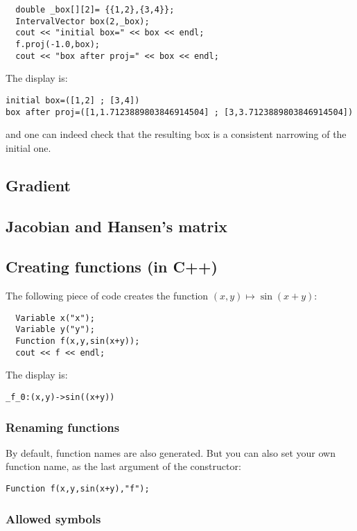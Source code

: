 \begin{lstlisting}
  double _box[][2]= {{1,2},{3,4}};
  IntervalVector box(2,_box);
  cout << "initial box=" << box << endl;
  f.proj(-1.0,box);
  cout << "box after proj=" << box << endl;
\end{lstlisting}
The display is:
\begin{verbatim}
initial box=([1,2] ; [3,4])
box after proj=([1,1.7123889803846914504] ; [3,3.7123889803846914504])
\end{verbatim}
and one can indeed check that the resulting box is a consistent narrowing
of the initial one.

\subsection{Gradient}


\subsection{Jacobian and Hansen's matrix}

\subsection{Creating functions (in C++)}\label{sec:mod-func-cpp}

The following piece of code creates the function
$(x,y)\mapsto \sin(x+y)$:

\begin{lstlisting}	
  Variable x("x");
  Variable y("y");
  Function f(x,y,sin(x+y));
  cout << f << endl;
\end{lstlisting}

The display is:
\begin{lstlisting}
_f_0:(x,y)->sin((x+y))
\end{lstlisting}

\subsubsection{Renaming functions}

By default, function names are also generated. But you can also set your own function name, as the last argument of the constructor:
\begin{lstlisting}
Function f(x,y,sin(x+y),"f");
\end{lstlisting}

\subsubsection{Allowed symbols}

